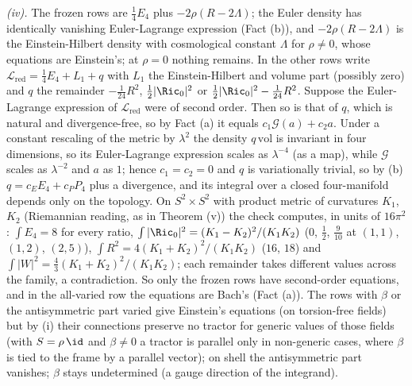 \emph{(iv).} The frozen rows are $\tfrac14 E_{4}$ plus $-2\rho(R - 2\Lambda)$; the Euler density has identically vanishing Euler-Lagrange expression (Fact (b)), and $-2\rho(R - 2\Lambda)$ is the Einstein-Hilbert density with cosmological constant $\Lambda$ for $\rho \neq 0$, whose equations are Einstein's; at $\rho = 0$ nothing remains. In the other rows write $\mathcal{L}_{\mathrm{red}} = \tfrac14 E_{4} + L_{1} + q$ with $L_{1}$ the Einstein-Hilbert and volume part (possibly zero) and $q$ the remainder $-\tfrac{1}{24}R^{2}$, $\tfrac12|\Ric_{0}|^{2}$ or $\tfrac12|\Ric_{0}|^{2} - \tfrac{1}{24}R^{2}$. Suppose the Euler-Lagrange expression of $\mathcal{L}_{\mathrm{red}}$ were of second order. Then so is that of $q$, which is natural and divergence-free, so by Fact (a) it equals $c_{1}\mathcal{G}(a) + c_{2}a$. Under a constant rescaling of the metric by $\lambda^{2}$ the density $q\,\mathrm{vol}$ is invariant in four dimensions, so its Euler-Lagrange expression scales as $\lambda^{-4}$ (as a map), while $\mathcal{G}$ scales as $\lambda^{-2}$ and $a$ as $1$; hence $c_{1} = c_{2} = 0$ and $q$ is variationally trivial, so by (b) $q = c_{E}E_{4} + c_{P}P_{4}$ plus a divergence, and its integral over a closed four-manifold depends only on the topology. On $S^{2} \times S^{2}$ with product metric of curvatures $K_{1}$, $K_{2}$ (Riemannian reading, as in Theorem (v)) the check computes, in units of $16\pi^{2}$: $\int E_{4} = 8$ for every ratio, $\int |\Ric_{0}|^{2} = (K_{1} - K_{2})^{2}/(K_{1}K_{2})$ ($0$, $\tfrac12$, $\tfrac{9}{10}$ at $(1,1)$, $(1,2)$, $(2,5)$), $\int R^{2} = 4(K_{1} + K_{2})^{2}/(K_{1}K_{2})$ ($16$, $18$) and $\int |W|^{2} = \tfrac43(K_{1}+K_{2})^{2}/(K_{1}K_{2})$; each remainder takes different values across the family, a contradiction. So only the frozen rows have second-order equations, and in the all-varied row the equations are Bach's (Fact (a)). The rows with $\beta$ or the antisymmetric part varied give Einstein's equations (on torsion-free fields) but by (i) their connections preserve no tractor for generic values of those fields (with $S = \rho\,\id$ and $\beta \neq 0$ a tractor is parallel only in non-generic cases, where $\beta$ is tied to the frame by a parallel vector); on shell the antisymmetric part vanishes; $\beta$ stays undetermined (a gauge direction of the integrand).

